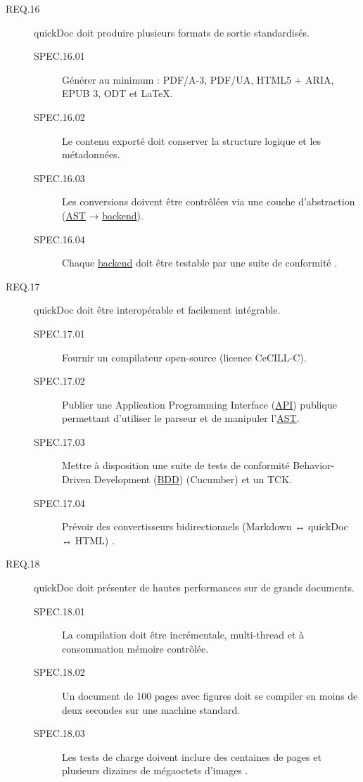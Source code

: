 \documentclass[a4paper,12pt]{article}
\begin{document}
\begin{description}
\item[{\label{org744d12c}REQ.16}] quickDoc doit produire plusieurs formats de sortie standardisés.
\begin{description}
\item[{\label{orgb70b2d5}SPEC.16.01}] Générer au minimum : PDF/A-3, PDF/UA, HTML5 + ARIA, EPUB 3, ODT et \LaTeX{}.
\item[{\label{org99a0481}SPEC.16.02}] Le contenu exporté doit conserver la structure logique et les métadonnées.
\item[{\label{org335dc07}SPEC.16.03}] Les conversions doivent être contrôlées via une couche d’abstraction (\protect\hyperlink{gls-3}{\label{gls-3-use-3}AST} → \protect\hyperlink{gls-4}{\label{gls-4-use-1}backend}).
\item[{\label{orgfdaca64}SPEC.16.04}] Chaque \protect\hyperlink{gls-4}{\label{gls-4-use-2}backend} doit être testable par une suite de conformité \autocite{johnmacfarlanePandocUsersGuide2025,massimilianodominiciOverviewPandoc2014}.
\end{description}

\item[{\label{orga02218c}REQ.17}] quickDoc doit être interopérable et facilement intégrable.
\begin{description}
\item[{\label{org34ce372}SPEC.17.01}] Fournir un compilateur open-source (licence CeCILL-C).
\item[{\label{org516306c}SPEC.17.02}] Publier une Application Programming Interface
 (\protect\hyperlink{gls-5}{\label{gls-5-use-1}API}) publique permettant d’utiliser le parseur et de manipuler l’\protect\hyperlink{gls-3}{\label{gls-3-use-4}AST}.
\item[{\label{org479f73a}SPEC.17.03}] Mettre à disposition une suite de tests de conformité Behavior-Driven Development
 (\protect\hyperlink{gls-6}{\label{gls-6-use-1}BDD}) (Cucumber) et un TCK.
\item[{\label{org0bb15d2}SPEC.17.04}] Prévoir des convertisseurs bidirectionnels (Markdown ↔ quickDoc ↔ HTML) \autocite{EclipseProjectsAsciiDoc2025,GithubSpeckit2025}.
\end{description}

\item[{\label{org756a2b0}REQ.18}] quickDoc doit présenter de hautes performances sur de grands documents.
\begin{description}
\item[{\label{org8fb93db}SPEC.18.01}] La compilation doit être incrémentale, multi-thread et à consommation mémoire contrôlée.
\item[{\label{org4bd09de}SPEC.18.02}] Un document de 100 pages avec figures doit se compiler en moins de deux secondes sur une machine standard.
\item[{\label{org01ee549}SPEC.18.03}] Les tests de charge doivent inclure des centaines de pages et plusieurs dizaines de mégaoctets d’images \autocite{petrolsakTeXNutshell2021,olsakComparisonOpTeXOther2021}.
\end{description}


\end{description}
\end{document}
